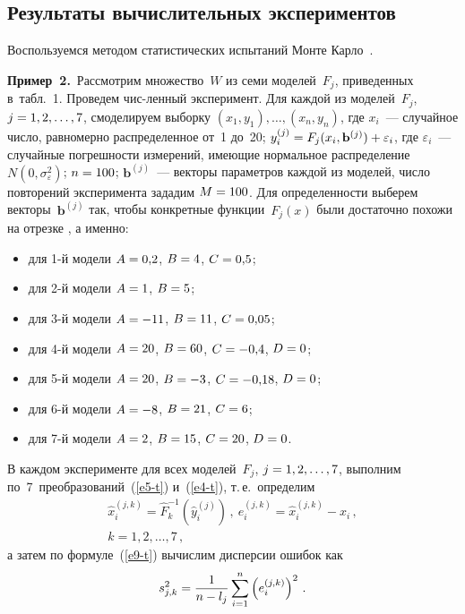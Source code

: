 \begin{multicols}{2}
\section{Результаты вычислительных экспериментов}

  Воспользуемся методом статистических испытаний Монте Карло~\cite{12-t}.
  
  \smallskip
  
  \noindent
  \textbf{Пример~2.}\ Рассмотрим множество~$W$ из семи моделей~$F_j$, 
приведенных в~табл.~1. Проведем чис-\linebreak ленный эксперимент. Для каждой из 
моделей~$F_j$, $j\hm=1,2,\ldots, 7$, смоделируем выборку $(x_1,y_1), \ldots , 
(x_n,y_n)$, где $x_i$~--- случайное число, равномерно распределенное от~1 
до~20; $y_i^{(j)} \hm= F_j(x_i, \mathbf{b}^{(j)})\hm+\varepsilon_i$, 
где $\varepsilon_i$~--- случайные погрешности измерений, имеющие нормальное 
распределение $N(0,\sigma_\varepsilon^2)$; $n\hm=100$; $\mathbf{b}^{(j)}$~--- 
векторы параметров каж\-дой из моделей, число повторений эксперимента 
зададим $M\hm= 100$. Для определенности выберем 
векторы~$\mathbf{b}^{(j)}$ так, чтобы конкретные функции~$F_j(x)$ были 
достаточно похожи на отрезке $ $, а именно:
  \begin{itemize}
\item  для 1-й модели $A\hm= 0{,}2$, $B\hm=4$, $C\hm=0{,}5$;
\item для 2-й модели $A\hm=1$, $B\hm=5$;
\item для 3-й модели $A\hm= -11$, $B\hm= 11$, $C\hm= 0{,}05$;
\item для 4-й модели $A\hm=20$, $B\hm= 60$, $C\hm= -0{,}4$, $D\hm=0$;
\item для 5-й модели $A\hm=20$, $B\hm=-3$, $C\hm= -0{,}18$, $D\hm=0$;
\item для 6-й модели $A\hm= -8$, $B\hm= 21$, $C\hm=6$;
\item для 7-й модели $A\hm=2$, $B\hm= 15$, $C\hm= 20$, $D\hm=0$.
\end{itemize}
  
  В каждом эксперименте для всех моделей~$F_j$, $j\hm= 1,2,\ldots, 7$, 
выполним по~7~преобразований~(\ref{e5-t}) и~(\ref{e4-t}), т.\,е.\ определим
 \begin{multline*}
  \hat{x}_i^{(j,k)} = \hat{F}_k^{-1}\left(\hat{y}_i^{(j)}\right)\,,\ 
  e_i^{(j,k)} =\hat{x}_i^{(j,k)}- x_i\,,\\
   k=1,2,\ldots ,7\,,
  \end{multline*}
а затем по формуле~(\ref{e9-t}) вычислим дисперсии ошибок как
\begin{equation}
s^2_{j,k} =\displaystyle\frac{\displaystyle 1\mathstrut}{\displaystyle n-l_j\mathstrut} \sum\limits_{i=1}^n \left( e_i^{(j,k)} \right)^2\,.
\label{e11-t}
  \end{equation}
  

\end{multicols}
